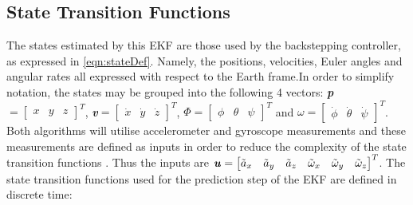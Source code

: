 \subsection{State Transition Functions}\label{section:StateTrans}
The states estimated by this EKF are those used by the backstepping controller, as expressed in \eqref{eqn:stateDef}. Namely, the positions, velocities, Euler angles and angular rates all expressed with respect to the Earth frame.In order to simplify notation, the states may be grouped into the following 4 vectors: \textbf{\textit{p}}$=\begin{bmatrix}x& y& z\end{bmatrix}^{T}$, \textbf{\textit{v}}$=\begin{bmatrix}\dot{x}& \dot{y}& \dot{z}\end{bmatrix}^{T}$, \textbf{\textit{$\Phi$}}$=\begin{bmatrix}\phi& \theta& \psi\end{bmatrix}^{T}$ and \textbf{\textit{$\omega$}}$=\begin{bmatrix}\dot{\phi}& \dot{\theta}& \dot{\psi}\end{bmatrix}^{T}$. Both algorithms will utilise accelerometer and gyroscope measurements and these measurements are defined as inputs in order to reduce the complexity of the state transition functions \cite{Driessen2018}. Thus the inputs are $\textbf{\textit{u}}=
\begin{bmatrix}
\tilde{a}_{x}&\tilde{a}_{y}&\tilde{a}_{z}&\tilde{\omega}_{x}&\tilde{\omega}_{y}&\tilde{\omega}_{z}
\end{bmatrix}^{T}
$. The state transition functions used for the prediction step of the EKF are defined in discrete time:
